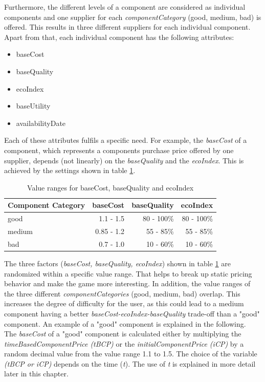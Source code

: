Furthermore, the different levels of a component are considered as individual components and one supplier for each \textit{componentCategory} (good, medium, bad) is offered. This results in three different suppliers for each individual component.\\
Apart from that, each individual component has the following attributes:
\begin{itemize}
    \item baseCost
    \item baseQuality
    \item ecoIndex
    \item baseUtility
    \item availabilityDate
\end{itemize}
Each of these attributes fulfils a specific need. For example, the \textit{baseCost} of a component, which represents a components purchase price offered by one supplier, depends (not linearly) on the \textit{baseQuality} and the \textit{ecoIndex}. This is achieved by the settings shown in table \ref{component_price_calculation}.
    \begin{table}[ht]
    \centering
    \begin{tabular}{|l|r|r|r|}
    \hline
    Component Category & baseCost & baseQuality & ecoIndex \\
    \hline
    good & 1.1 - 1.5 & 80 - 100\% & 80 - 100\% \\
    medium & 0.85 - 1.2 & 55 - 85\% & 55 - 85\%\\
    bad  & 0.7 - 1.0 & 10 - 60\% & 10 - 60\%\\
    \hline
    \end{tabular}
    \caption{Value ranges for baseCost, baseQuality and ecoIndex}
    \label{component_price_calculation}
    \end{table}
\newline
The three factors (\textit{baseCost, baseQuality, ecoIndex}) shown in table \ref{component_price_calculation} are randomized within a specific value range. That helps to break up static pricing behavior and make the game more interesting. In addition, the value ranges of the three different \textit{componentCategories} (good, medium, bad) overlap. This increases the degree of difficulty for the user, as this could lead to a medium component having a better \textit{baseCost-ecoIndex-baseQuality} trade-off than a "good" component. An example of a "good" component is explained in the following.\\
The \textit{baseCost} of a "good" component is calculated either by multiplying the \textit{timeBasedComponentPrice (tBCP)} or the \textit{initialComponentPrice (iCP)} by a random decimal value from the value range 1.1 to 1.5. The choice of the variable \textit{(tBCP or iCP)} depends on the time (\textit{t}). The use of \textit{t} is explained in more detail later in this chapter.
